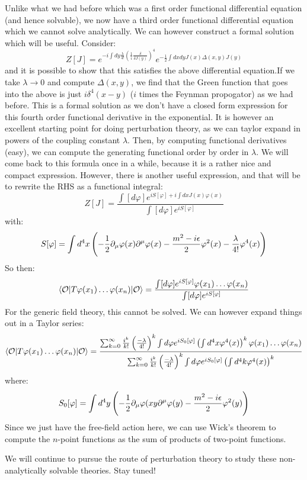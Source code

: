 Unlike what we had before which was a first order functional differential equation (and hence solvable), we now have a third order functional differential equation which we cannot solve analytically. We can however construct a formal solution which will be useful. Consider:
\begin{equation}
    Z[J] = e^{-i\int dy \frac{\lambda}{4!}\left(\frac{1}{i}\frac{\delta}{\delta J(y)}\right)^4}e^{-\frac{1}{2}\int dxdy J(x)\Delta(x, y)J(y)}
\end{equation}
and it is possible to show that this satisfies the above differential equation.If we take $\lambda \to 0$ and compute $\Delta(x, y)$, we find that the Green function that goes into the above is just $i\delta^4(x- y)$ ($i$ times the Feynman propogator) as we had before. This is a formal solution as we don't have a closed form expression for this fourth order functional derivative in the exponential. It is however an excellent starting point for doing perturbation theory, as we can taylor expand in powers of the coupling constant $\lambda$. Then, by computing functional derivatives (easy), we can compute the generating functional order by order in $\lambda$. We will come back to this formula once in a while, because it is a rather nice and compact expression. However, there is another useful expression, and that will be to rewrite the RHS as a functional integral:
\begin{equation}
    Z[J] = \frac{\int [d\varphi] e^{iS[\varphi] + i\int dx J(x)\varphi(x)}}{\int [d\varphi]e^{iS[\varphi]}}
\end{equation}
with:
\begin{equation}
    S[\varphi] = \int d^4x \left(-\frac{1}{2}\p_\mu \varphi(x) \p^\mu \varphi(x) - \frac{m^2 - i\e}{2}\varphi^2(x) - \frac{\lambda}{4!}\varphi^4(x)\right)
\end{equation}
So then:
\begin{equation}
    \bra{\O}T\varphi(x_1) \ldots \varphi(x_n)\ket{\O} = \frac{\int [d\varphi]e^{iS[\varphi]}\varphi(x_1)\ldots \varphi(x_n)}{\int [d\varphi]e^{iS[\varphi]}}
\end{equation}
For the generic field theory, this cannot be solved. We can however expand things out in a Taylor series:
\begin{equation}
    \bra{\O}T\varphi(x_1) \ldots \varphi(x_n)\ket{\O} = \frac{\sum_{k=0}^\infty \frac{i^k}{k!}\left(\frac{-\lambda}{4!}\right)^k \int d\varphi e^{iS_0[\varphi]} \left(\int d^4x \varphi^4(x)\right)^k \varphi(x_1)\ldots\varphi(x_n)}{\sum_{k=0}^\infty \frac{i^k}{k!}\left(\frac{-\lambda}{4!}\right)^k \int d\varphi e^{iS_0[\varphi]}\left(\int d^4k \varphi^4(x)\right)^k}
\end{equation}
where:
\begin{equation}
    S_0[\varphi] = \int d^4y \left(-\frac{1}{2}\p_\mu \varphi(xy \p^\mu \varphi(y) - \frac{m^2 - i\e}{2}\varphi^2(y)\right)
\end{equation}
Since we just have the free-field action here, we can use Wick's theorem to compute the $n$-point functions as the sum of products of two-point functions.

We will continue to pursue the route of perturbation theory to study these non-analytically solvable theories. Stay tuned!